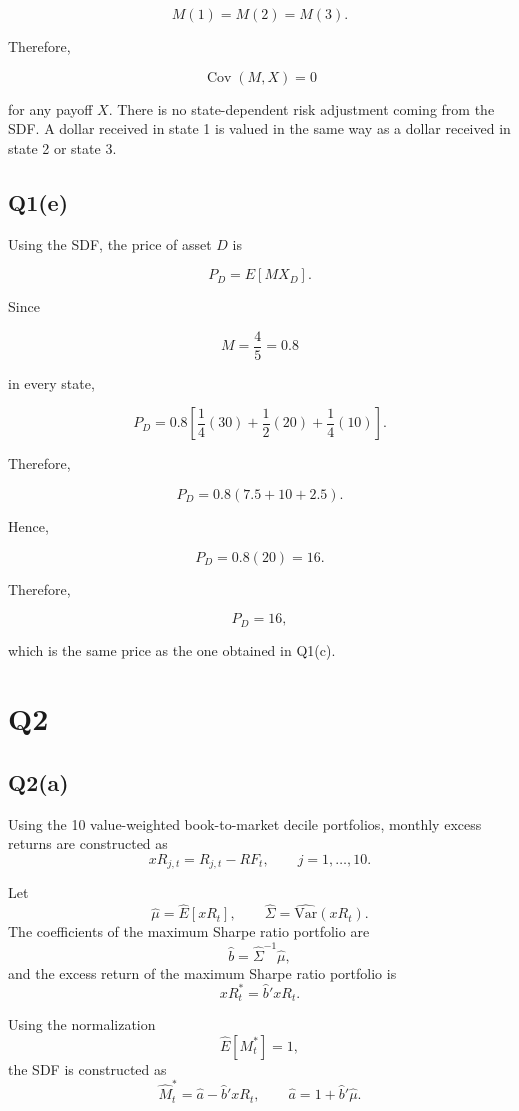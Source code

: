\documentclass{article}
\begin{document}
\[
M(1)=M(2)=M(3).
\]

Therefore,

\[
\operatorname{Cov}(M,X)=0
\]

for any payoff \(X\). There is no state-dependent risk adjustment coming from the SDF. A dollar received in state 1 is valued in the same way as a dollar received in state 2 or state 3.

\subsection{Q1(e)}

Using the SDF, the price of asset \(D\) is

\[
P_D
=
E[M X_D].
\]

Since

\[
M=\frac{4}{5}=0.8
\]

in every state,

\[
P_D
=
0.8
\left[
\frac{1}{4}(30)
+
\frac{1}{2}(20)
+
\frac{1}{4}(10)
\right].
\]

Therefore,

\[
P_D
=
0.8
\left(
7.5+10+2.5
\right).
\]

Hence,

\[
P_D
=
0.8(20)
=
16.
\]

Therefore,

\[
\boxed{P_D=16,}
\]

which is the same price as the one obtained in Q1(c).


\section{Q2}


\subsection{Q2(a)}

Using the 10 value-weighted book-to-market decile portfolios, monthly excess returns are constructed as
\[
xR_{j,t}=R_{j,t}-RF_t,
\qquad j=1,\ldots,10.
\]

Let
\[
\hat\mu=\hat E[xR_t],
\qquad
\hat\Sigma=\widehat{\mathrm{Var}}(xR_t).
\]
The coefficients of the maximum Sharpe ratio portfolio are
\[
\hat b=\hat\Sigma^{-1}\hat\mu,
\]
and the excess return of the maximum Sharpe ratio portfolio is
\[
xR_t^*=\hat b'xR_t.
\]

Using the normalization
\[
\hat E[M_t^*]=1,
\]
the SDF is constructed as
\[
\hat M_t^*
=
\hat a-\hat b'xR_t,
\qquad
\hat a=1+\hat b'\hat\mu.
\]
\end{document}
